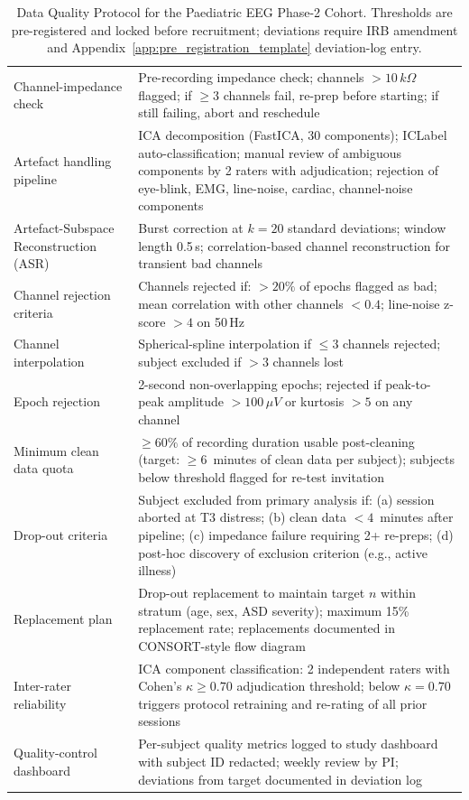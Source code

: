 {
\begin{xltabular}{\textwidth}{@{} >{\raggedright\arraybackslash}p{3.2cm} L @{}}
\caption[Data Quality Protocol --- Paediatric EEG Phase-2]{Data Quality Protocol for the Paediatric EEG Phase-2 Cohort. Thresholds are pre-registered and locked before recruitment; deviations require IRB amendment and Appendix~\ref{app:pre_registration_template} deviation-log entry.}\label{tab:appg_data_quality}\\
\toprule
{} &  \\
\midrule
\endfirsthead
\endhead
\bottomrule
\endlastfoot
Channel-impedance check & Pre-recording impedance check; channels $> 10\,k\Omega$ flagged; if $\geq 3$ channels fail, re-prep before starting; if still failing, abort and reschedule \\
Artefact handling pipeline & ICA decomposition (FastICA, 30 components); ICLabel auto-classification; manual review of ambiguous components by 2 raters with adjudication; rejection of eye-blink, EMG, line-noise, cardiac, channel-noise components \\
Artefact-Subspace Reconstruction (ASR) & Burst correction at $k = 20$ standard deviations; window length 0.5\,s; correlation-based channel reconstruction for transient bad channels \\
Channel rejection criteria & Channels rejected if: $> 20\%$ of epochs flagged as bad; mean correlation with other channels $< 0.4$; line-noise z-score $> 4$ on 50\,Hz \\
Channel interpolation & Spherical-spline interpolation if $\leq 3$ channels rejected; subject excluded if $> 3$ channels lost \\
Epoch rejection & 2-second non-overlapping epochs; rejected if peak-to-peak amplitude $> 100\,\mu V$ or kurtosis $> 5$ on any channel \\
Minimum clean data quota & $\geq 60\%$ of recording duration usable post-cleaning (target: $\geq 6$~minutes of clean data per subject); subjects below threshold flagged for re-test invitation \\
Drop-out criteria & Subject excluded from primary analysis if: (a) session aborted at T3 distress; (b) clean data $< 4$~minutes after pipeline; (c) impedance failure requiring 2+ re-preps; (d) post-hoc discovery of exclusion criterion (e.g., active illness) \\
Replacement plan & Drop-out replacement to maintain target $n$ within stratum (age, sex, ASD severity); maximum 15\% replacement rate; replacements documented in CONSORT-style flow diagram \\
Inter-rater reliability & ICA component classification: 2 independent raters with Cohen's $\kappa \geq 0.70$ adjudication threshold; below $\kappa = 0.70$ triggers protocol retraining and re-rating of all prior sessions \\
Quality-control dashboard & Per-subject quality metrics logged to study dashboard with subject ID redacted; weekly review by PI; deviations from target documented in deviation log \\
\end{xltabular}}
